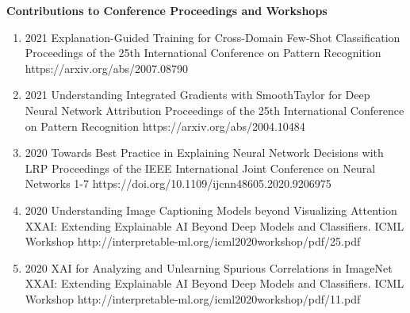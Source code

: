 \documentclass[10pt,a4paper]{article} %
\begin{document}
\headedsection %
{\bf Contributions to Conference Proceedings and Workshops}{}
{
    \begin{enumerate}

        \item {}
                                {2021}
                                {Explanation-Guided Training for Cross-Domain Few-Shot Classification}
                                {Proceedings of the 25th International Conference on Pattern Recognition}
                                {}
                                {https://arxiv.org/abs/2007.08790}

        \item {}
                                {2021}
                                {Understanding Integrated Gradients with SmoothTaylor for Deep Neural Network Attribution}
                                {Proceedings of the 25th International Conference on Pattern Recognition}
                                {}
                                {https://arxiv.org/abs/2004.10484}

        \item {}
                                {2020}
                                {Towards Best Practice in Explaining Neural Network Decisions with LRP}
                                {Proceedings of the IEEE International Joint Conference on Neural Networks}
                                {1-7}
                                {https://doi.org/10.1109/ijcnn48605.2020.9206975}

        \item {}
                                {2020}
                                {Understanding Image Captioning Models beyond Visualizing Attention}
                                {XXAI: Extending Explainable AI Beyond Deep Models and Classifiers. ICML Workshop}
                                {}
                                {http://interpretable-ml.org/icml2020workshop/pdf/25.pdf}


        \item {}
                                {2020}
                                {XAI for Analyzing and Unlearning Spurious Correlations in ImageNet}
                                {XXAI: Extending Explainable AI Beyond Deep Models and Classifiers. ICML Workshop}
                                {}
                                {http://interpretable-ml.org/icml2020workshop/pdf/11.pdf}



\end{enumerate}}
\end{document}
